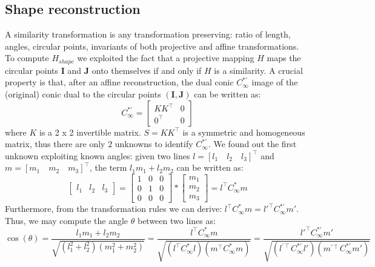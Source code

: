 \documentclass[11pt, oneside]{article}
\begin{document}
\subsection{Shape reconstruction}
A similarity transformation is any transformation preserving: ratio of length, angles, circular points, invariants of both projective and affine transformations. To compute $H_{shape}$ we exploited the fact that a projective mapping $H$ maps the circular points $\textbf{I}$ and $\textbf{J}$ onto themselves if and only if $H$ is  a similarity. A crucial property is that, after an affine reconstruction, the dual conic $C^{*'}_\infty$ image of the (original) conic dual to the circular points $(\textbf{I},\textbf{J})$ can be written as:
\begin{equation}
	C^{*'}_\infty = 
	\begin{bmatrix}
		KK^\intercal  & 0 \\ 0^\intercal & 0
	\end{bmatrix}
\end{equation}
where $K$ is a 2 x 2 invertible matrix. $S = KK^\intercal$ is a symmetric and homogeneous matrix, thus there are only 2 unknowns to identify $C^{*'}_\infty$. We found out the first unknown exploiting known angles: given two lines $l = [l_1\quad l_2 \quad l_3]^\intercal$ and $m = [m_1\quad m_2 \quad m_3]^\intercal$, the term $l_1 m_1 + l_2 m_2$ can be written as:
\begin{equation}
	\begin{bmatrix}
		l_1 & l_2 & l_3
	\end{bmatrix}
	=
	\begin{bmatrix}
		1 & 0 & 0 \\ 0 & 1 & 0 \\ 0 & 0 & 0
	\end{bmatrix} *
	\begin{bmatrix}
		m_1 \\ m_2 \\ m_3
	\end{bmatrix}
	= l^\intercal C^{*}_\infty m
\end{equation}
Furthermore, from the transformation rules we can derive: $l^\intercal C^{*}_\infty m = l{'^\intercal} C^{*'}_\infty m'$. Thus, we may compute the angle $\theta$ between two lines as:
\begin{equation}
	\label{eqn:angle}
	\cos(\theta) = \frac{l_1 m_1 + l_2  m_2}{\sqrt{(l_1^2 + l_2^2)(m_1^2 + m_2 ^2)}}
	=
	\frac{l^\intercal C^{*}_\infty m}{\sqrt{(l^\intercal C^{*}_\infty l)(m^\intercal C^{*}_\infty m)}} 
	= 
	\frac{l{'^\intercal} C^{*'}_\infty m'}{\sqrt{(l^{'\intercal} C^{*'}_\infty l')(m^{'\intercal} C^{*'}_\infty m')}}
\end{equation}
\end{document}
